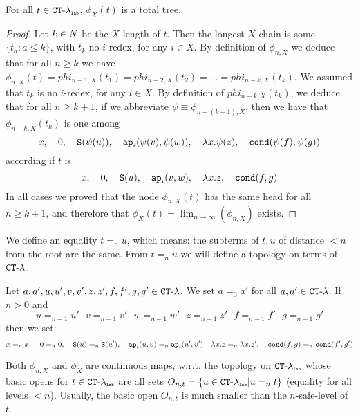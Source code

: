 \begin{lemma}
For all $t \in { { {\tt CT} \mbox{-} \lambda} _ {\mbox{\tiny \tt lab}} }$, $\phi_X(t)$ is a total tree.
\end{lemma}


\begin{proof}
Let $k\in {N}$ be the $X$-length of $t$. Then the longest $X$-chain is some $\{t_a : a \le k\}$,
with $t_k$ no $i$-redex, for any $i \in X$.
By definition of $\phi_{n,X}$ we deduce that for all $n \ge k$ we have $\phi_{n,X}(t)
= phi_{n-1,X}(t_1) = phi_{n-2,X}(t_2) = \ldots = phi_{n-k,X}(t_k)$. 
We assumed that $t_k$ is no $i$-redex, for any $i \in X$.
By definition of $phi_{n-k,X}(t_k)$, 
we deduce that for all $n \ge k+1$, if we abbreviate $\psi \equiv \phi_{n-(k+1),X}$, then
we have that $\phi_{n-k,X}(t_k)$ is one among
$$ 
x, \ \ \  
0, \ \ \  
{\tt S}(\psi(u)),  \ \ \  
{\tt ap}_i(\psi(v), \psi(w)), \ \ \  
\lambda x.\psi(z), \ \ \  
{\tt cond}(\psi(f), \psi(g))
$$
according if $t$ is
$$ 
x, \ \ \  
0, \ \ \  
{\tt S}(u),  \ \ \  
{\tt ap}_i(v,w), \ \ \  
\lambda x.z, \ \ \  
{\tt cond}(f,g)
$$
In all cases we proved that the node $\phi_{n,X}(t)$ has the same head for all $n \ge k+1$,
and therefore that $\phi_X(t) = \lim_{n \rightarrow \infty}(\phi_{n,X})$ exists.
\end{proof}


We define an equality $t =_n u$, which means: the subterms of $t,u$ of distance $<n$ from the root are the
same. From $t =_n u$ we will define a topology on terms of $\CTlambda$.

\begin{definition}[$n$-equality on Terms of $\CTlambda$]
Let $a,a',u,u',v,v',z,z',f,f',g,g' \in { {\tt CT} \mbox{-} \lambda}$. We set
$a=_0 a'$ for all $a,a' \in { {\tt CT} \mbox{-} \lambda}$. If $n>0$ and
$$
u=_{n-1} u' \ \ \ v=_{n-1} v' \ \ \ w=_{n-1} w' \ \ \ z=_{n-1} z' \ \ \ f=_{n-1} f' \ \ \ g=_{n-1} g'
$$
then we set:
$$
x=_{n} x, \ \ \  
0=_{n} 0, \ \ \   
\Succ(u)=_{n} \Succ(u'), \ \ \ 
\ap_i(u,v) =_{n} \ap_i(u',v') \ \ \  
\lambda x.z =_{n} \lambda x.z', \ \ \ 
\cond(f,g) =_{n} \cond(f',g')
$$
\end{definition}


Both $\phi_{n,X}$ and $\phi_X$ are continuous maps, w.r.t. the topology on ${{ {\tt CT} \mbox{-} \lambda}_{\mbox{\tiny \tt lab}}}$
whose basic opens for $t \in { { {\tt CT} \mbox{-} \lambda} _ {\mbox{\tiny \tt lab}} }$ are all sets 
$O_{n,t} = \{u \in { { {\tt CT} \mbox{-} \lambda} _ {\mbox{\tiny \tt lab}} } | u =_{n} t\}$ (equality for all levels $<n$).
Usually,  the basic open $O_{n,t}$ is much smaller than the $n$-safe-level of $t$. 



